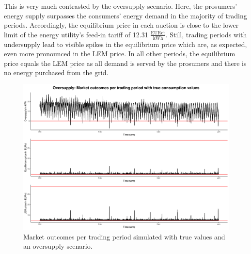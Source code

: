 This is very much contrasted by the oversupply scenario. Here, the prosumers' energy supply surpasses the consumers' energy demand in the majority of trading periods. Accordingly, the equilibrium price in each auction is close to the lower limit of the energy utility's feed-in tariff of 12.31 $\frac{\text{EURct}}{\text{kWh}}$. Still, trading periods with undersupply lead to visible spikes in the equilibrium price which are, as expected, even more pronounced in the LEM price. In all other periods, the equilibrium price equals the LEM price as all demand is served by the prosumers and there is no energy purchased from the grid.
%
\begin{figure}[htbp]
    \centering
    \includegraphics[width=\textwidth]{thesis/graphs/marketsimulation/marketoutcome_true_oversupply.pdf}
    \caption[Market outcomes simulated with oversupply and true values]{Market outcomes per trading period simulated with true values and an oversupply scenario. \quantnet\href{}{}}
    \label{Fig:marketoutcomes_true_over}
\end{figure}
%


